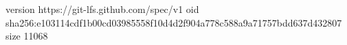 version https://git-lfs.github.com/spec/v1
oid sha256:e103114cdf1b00cd03985558f10d4d2f904a778c588a9a71757bdd637d432807
size 11068
